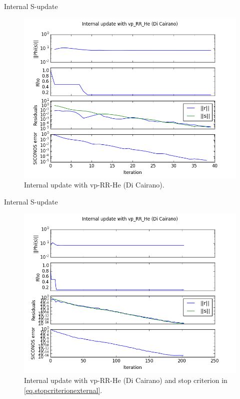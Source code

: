 \documentclass[8pt,red]{beamer}
\theoremstyle{plain}
\theoremstyle{definition}
\theoremstyle{remark}
\newcommand{\bi}[1]{\ensuremath{\boldsymbol{#1}}}
\begin{document}
\begin{frame}{Internal S-update}
\begin{figure}[hbtp]
\centering
\includegraphics[scale=0.4]{Results/S_update/Internal13.png}
\caption{Internal update with vp-RR-He (Di Cairano).}
\end{figure}
\end{frame}

\begin{frame}{Internal S-update}
\begin{figure}[hbtp]
\centering
\includegraphics[scale=0.4]{Results/S_update/Internal13outsidestop.png}
\caption{Internal update with vp-RR-He (Di Cairano) and stop criterion in \eqref{eq.stopcriterionexternal}.}
\end{figure}
\end{frame}
\end{document}
